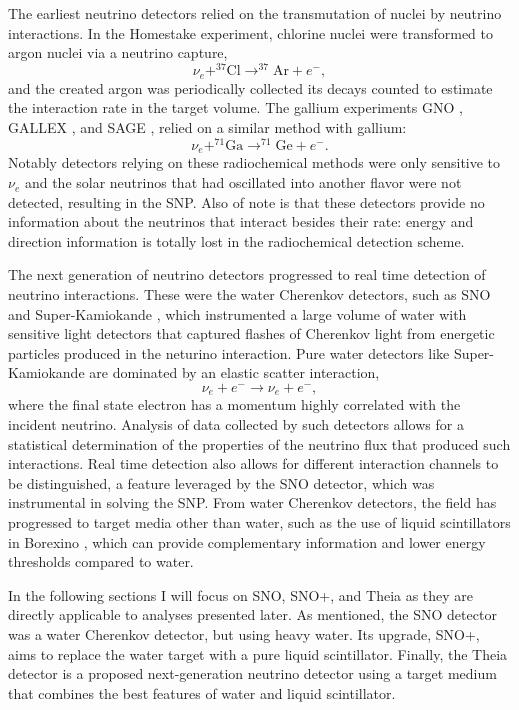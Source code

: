 The earliest neutrino detectors relied on the transmutation of nuclei by neutrino interactions. 
In the Homestake \cite{homestake} experiment, chlorine nuclei were transformed to argon nuclei via a neutrino capture,
\begin{equation}
\nu_e + ^{37}\mathrm{Cl} \rightarrow ^{37}\mathrm{Ar} + e^-,
\end{equation}
and the created argon was periodically collected its decays counted to estimate the interaction rate in the target volume.
The gallium experiments GNO \cite{gno}, GALLEX \cite{gallex}, and SAGE \cite{sagecombo}, relied on a similar method with gallium:
\begin{equation}
\nu_e + ^{71}\mathrm{Ga} \rightarrow ^{71}\mathrm{Ge} + e^-.
\end{equation}
Notably detectors relying on these radiochemical methods were only sensitive to $\nu_e$ and the solar neutrinos that had oscillated into another flavor were not detected, resulting in the SNP.
Also of note is that these detectors provide no information about the neutrinos that interact besides their rate: energy and direction information is totally lost in the radiochemical detection scheme.

The next generation of neutrino detectors progressed to real time detection of neutrino interactions.
These were the water Cherenkov detectors, such as SNO \cite{3phase} and Super-Kamiokande \cite{superk}, which instrumented a large volume of water with sensitive light detectors that captured flashes of Cherenkov light from energetic particles produced in the neturino interaction.
Pure water detectors like Super-Kamiokande are dominated by an elastic scatter interaction,
\begin{equation}
\nu_e + e^- \rightarrow \nu_e + e^-,
\end{equation}
where the final state electron has a momentum highly correlated with the incident neutrino.
Analysis of data collected by such detectors allows for a statistical determination of the properties of the neutrino flux that produced such interactions.
Real time detection also allows for different interaction channels to be distinguished, a feature leveraged by the SNO detector, which was instrumental in solving the SNP.
From water Cherenkov detectors, the field has progressed to target media other than water, such as the use of liquid scintillators in Borexino \cite{borexino}, which can provide complementary information and lower energy thresholds compared to water. 

In the following sections I will focus on SNO, SNO+, and Theia as they are directly applicable to analyses presented later.
As mentioned, the SNO detector was a water Cherenkov detector, but using heavy water. 
Its upgrade, SNO+, aims to replace the water target with a pure liquid scintillator.
Finally, the Theia detector is a proposed next-generation neutrino detector using a target medium that combines the best features of water and liquid scintillator.

